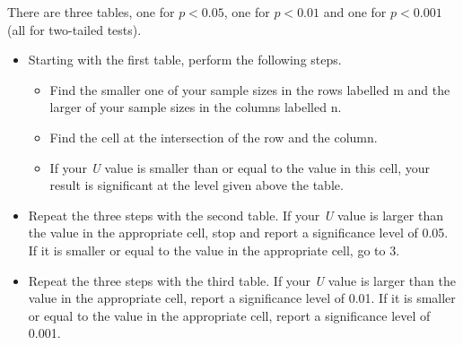 There are three tables, one for $p < 0.05$, one for $p < 0.01$ and one for $p < 0.001$ (all for two-tailed tests).

\begin{itemize}
    \item Starting with the first table, perform the following steps.
    \begin{itemize}
        \item Find the smaller one of your sample sizes in the rows labelled m and the larger of your sample sizes in the columns labelled n.
        \item Find the cell at the intersection of the row and the column.
        \item If your \textit{U} value is smaller than or equal to the value in this cell, your result is significant at the level given above the table.
    \end{itemize}
    \item Repeat the three steps with the second table. If your \textit{U} value is larger than the value in the appropriate cell, stop and report a significance level of 0.05. If it is smaller or equal to the value in the appropriate cell, go to 3.
    \item Repeat the three steps with the third table. If your \textit{U} value is larger than the value in the appropriate cell, report a significance level of 0.01. If it is smaller or equal to the value in the appropriate cell, report a significance level of 0.001.
\end{itemize}

